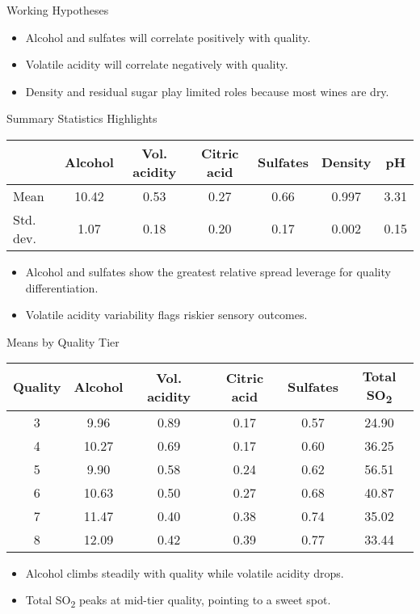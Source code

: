 \documentclass[aspectratio=169]{beamer}
\begin{document}
\begin{frame}{Working Hypotheses}
  \begin{itemize}
    \item Alcohol and sulfates will correlate positively with quality.
    \item Volatile acidity will correlate negatively with quality.
    \item Density and residual sugar play limited roles because most wines are dry.
  \end{itemize}
\end{frame}

\begin{frame}{Summary Statistics Highlights}
  \small
  \begin{tabular}{lS[table-format=2.2]S[table-format=1.2]S[table-format=1.2]S[table-format=1.2]S[table-format=1.3]S[table-format=1.2]}
    \toprule
    & {Alcohol} & {Vol. acidity} & {Citric acid} & {Sulfates} & {Density} & {pH} \\
    \midrule
    Mean & 10.42 & 0.53 & 0.27 & 0.66 & 0.997 & 3.31 \\
    Std. dev. & 1.07 & 0.18 & 0.20 & 0.17 & 0.002 & 0.15 \\
  \end{tabular}
  \vspace{0.75em}
  \begin{itemize}
    \item Alcohol and sulfates show the greatest relative spread \textrightarrow{} leverage for quality differentiation.
    \item Volatile acidity variability flags riskier sensory outcomes.
  \end{itemize}
\end{frame}

\begin{frame}{Means by Quality Tier}
  \scriptsize
  \begin{tabular}{cS[table-format=2.2]S[table-format=1.2]S[table-format=1.2]S[table-format=1.2]S[table-format=2.1]}
    \toprule
    \textbf{Quality} & {Alcohol} & {Vol. acidity} & {Citric acid} & {Sulfates} & {Total SO\textsubscript{2}} \\
     & 9.96 & 0.89 & 0.17 & 0.57 & 24.90 \\
    4 & 10.27 & 0.69 & 0.17 & 0.60 & 36.25 \\
    5 & 9.90 & 0.58 & 0.24 & 0.62 & 56.51 \\
    6 & 10.63 & 0.50 & 0.27 & 0.68 & 40.87 \\
    7 & 11.47 & 0.40 & 0.38 & 0.74 & 35.02 \\
    8 & 12.09 & 0.42 & 0.39 & 0.77 & 33.44 \\
    \bottomrule
  \end{tabular}
  \vspace{0.75em}
  \begin{itemize}
    \item Alcohol climbs steadily with quality while volatile acidity drops.
    \item Total SO\textsubscript{2} peaks at mid-tier quality, pointing to a sweet spot.
  \end{itemize}
\end{frame}
\end{document}
